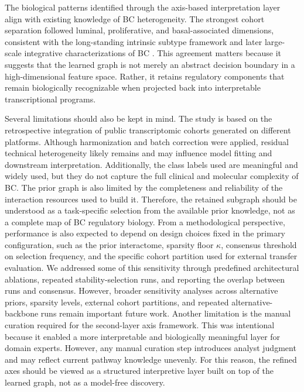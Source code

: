 \documentclass[unnumsec,webpdf,modern,large]{oup-authoring-template}
\begin{document}
The biological patterns identified through the axis-based interpretation layer align with existing knowledge of BC heterogeneity. The strongest cohort separation followed luminal, proliferative, and basal-associated dimensions, consistent with the long-standing intrinsic subtype framework and later large-scale integrative characterizations of BC \citep{Perou2000MolecularPortraits,Sorlie2003BreastSubtypes,TCGA2012BRCA}. This agreement matters because it suggests that the learned graph is not merely an abstract decision boundary in a high-dimensional feature space. Rather, it retains regulatory components that remain biologically recognizable when projected back into interpretable transcriptional programs.

Several limitations should also be kept in mind. The study is based on the retrospective integration of public transcriptomic cohorts generated on different platforms. Although harmonization and batch correction were applied, residual technical heterogeneity likely remains and may influence model fitting and downstream interpretation. Additionally, the class labels used are meaningful and widely used, but they do not capture the full clinical and molecular complexity of BC. The prior graph is also limited by the completeness and reliability of the interaction resources used to build it. Therefore, the retained subgraph should be understood as a task-specific selection from the available prior knowledge, not as a complete map of BC regulatory biology. From a methodological perspective, performance is also expected to depend on design choices fixed in the primary configuration, such as the prior interactome, sparsity floor \(\kappa\), consensus threshold on selection frequency, and the specific cohort partition used for external transfer evaluation. We addressed some of this sensitivity through predefined architectural ablations, repeated stability-selection runs, and reporting the overlap between runs and consensus. However, broader sensitivity analyses across alternative priors, sparsity levels, external cohort partitions, and repeated alternative-backbone runs remain important future work. Another limitation is the manual curation required for the second-layer axis framework. This was intentional because it enabled a more interpretable and biologically meaningful layer for domain experts. However, any manual curation step introduces analyst judgment and may reflect current pathway knowledge unevenly. For this reason, the refined axes should be viewed as a structured interpretive layer built on top of the learned graph, not as a model-free discovery.
\end{document}

